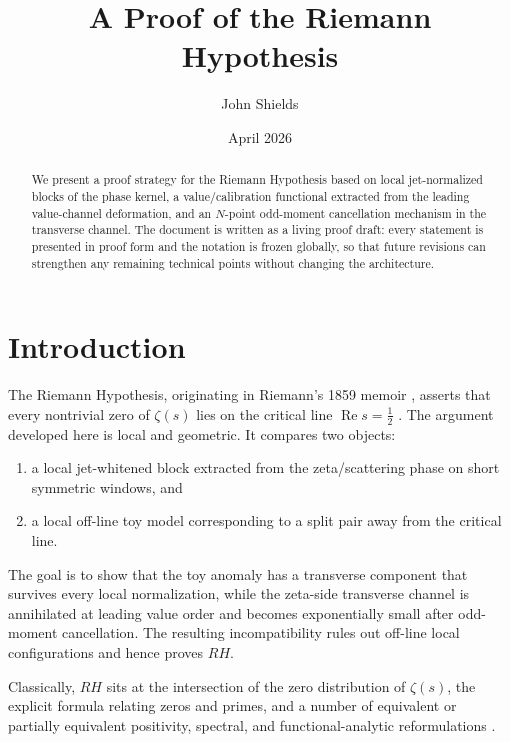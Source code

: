 \documentclass[11pt,a4paper]{amsart}
\title{A Proof of the Riemann Hypothesis}
\author{John Shields}
\date{April 2026}
\def\RH{RH}%
\theoremstyle{plain}
\theoremstyle{definition}
\newcommand{\RH}{\mathrm{RH}}
\newcommand{\RePart}{\operatorname{Re}}
\begin{document}
\begin{abstract}
We present a proof strategy for the Riemann Hypothesis based on local jet-normalized blocks of the phase kernel, a value/calibration functional extracted from the leading value-channel deformation, and an $N$-point odd-moment cancellation mechanism in the transverse channel. The document is written as a living proof draft: every statement is presented in proof form and the notation is frozen globally, so that future revisions can strengthen any remaining technical points without changing the architecture.
\end{abstract}

\maketitle

\tableofcontents

\newpage

\section{Introduction}

The Riemann Hypothesis, originating in Riemann's 1859 memoir \cite{Riemann1859}, asserts that every nontrivial zero of $\zeta(s)$ lies on the critical line $\RePart s = \tfrac12$ \cite{Bombieri2000,Conrey2003,Edwards2001,Titchmarsh1986}. The argument developed here is local and geometric. It compares two objects:
\begin{enumerate}[label=(\roman*),nosep]
    \item a local jet-whitened block extracted from the zeta/scattering phase on short symmetric windows, and
    \item a local off-line toy model corresponding to a split pair away from the critical line.
\end{enumerate}
The goal is to show that the toy anomaly has a transverse component that survives every local normalization, while the zeta-side transverse channel is annihilated at leading value order and becomes exponentially small after odd-moment cancellation. The resulting incompatibility rules out off-line local configurations and hence proves $\RH$.

Classically, $\RH$ sits at the intersection of the zero distribution of $\zeta(s)$, the explicit formula relating zeros and primes, and a number of equivalent or partially equivalent positivity, spectral, and functional-analytic reformulations \cite{Bombieri2000,Conrey2003}.
\end{document}
